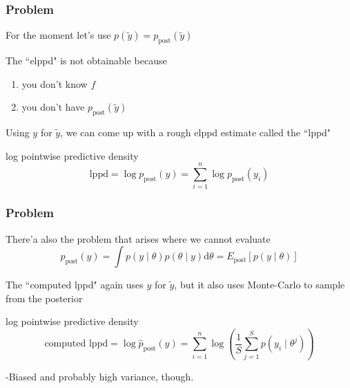 \documentclass{beamer}
\begin{document}
\begin{frame}
\frametitle{Problem}

For the moment let's use $p(\tilde{y}) = p_{\text{post}}(\tilde{y})$
\newline

The ``elppd" is not obtainable because
\begin{enumerate}
\item you don't know $f$ 
\item you don't have $p_{\text{post}}(\tilde{y})$ 
\end{enumerate}
\pause

Using $y$ for $\tilde{y}$, we can come up with a rough elppd estimate called the ``lppd"
\begin{block}{log pointwise predictive density}
\[
\text{lppd} = \log p_{\text{post}}(y) = \sum_{i=1}^n \log p_{\text{post}}(y_i) 
\]
\end{block}



\end{frame}


\begin{frame}
\frametitle{Problem}

There'a also the problem that arises where we cannot evaluate 
\[
p_{\text{post}}(y) = \int p(y \mid \theta) p(\theta \mid y) \text{d}\theta = E_{\text{post}}[p(y \mid \theta)]
\]

The ``computed lppd" again uses $y$ for $\tilde{y}$, but it also uses Monte-Carlo to sample from the posterior 
\begin{block}{log pointwise predictive density}
\[
\text{computed lppd} = \log \hat{p}_{\text{post}}(y) = \sum_{i=1}^n \log \left( \frac{1}{S} \sum_{j=1}^S p(y_i \mid \theta^j) \right) 
\]
\end{block}

-Biased and probably high variance, though.

\end{frame}
\end{document}
